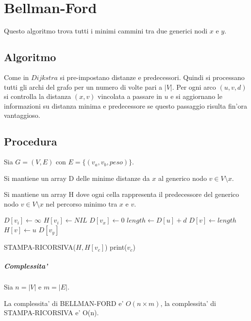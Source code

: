 \chapter{Bellman-Ford}

Questo algoritmo trova tutti i minimi cammini tra due generici nodi $x$ e $y$.

\section{Algoritmo}

Come in $Dijkstra$ si pre-impostano distanze e predecessori. Quindi si processano tutti gli archi del grafo per un numero di volte pari a $|V|$.
Per ogni arco $(u, v, d)$ si controlla la distanza $(x, v)$ vincolata a passare in $u$ e si aggiornano le informazioni su distanza minima e predecessore se questo passaggio risulta fin'ora vantaggioso.

\newpage

\section{Procedura}

Sia $G = (V, E)$ con $E = \{ (v_a, v_b, peso) \}$.

Si mantiene un array D delle minime distanze da $x$ al generico nodo $v \in V \setminus x$.

Si mantiene un array H dove ogni cella rappresenta il predecessore del generico nodo $v \in V \setminus x$ nel percorso minimo tra $x$ e $v$.

\begin{algorithm}
    \begin{algorithmic}
                \State $D[v_i] \gets \infty$
                \State $H[v_i] \gets NIL$
            \EndFor
            \State $D[v_x] \gets 0$
                    \State $length \gets D[u] + d$
                        \State $D[v] \gets length$
                        \State $H[v] \gets u$
                    \EndIf
                \EndFor
            \EndFor
            \State \Return $D[v_y]$
        \EndProcedure
    \end{algorithmic}
\end{algorithm}

\begin{algorithm}
    \begin{algorithmic}
                STAMPA-RICORSIVA($H, H[v_c]$)
            \EndIf
            print($v_c$)
        \EndProcedure
    \end{algorithmic}
\end{algorithm}

\paragraph{Complessita'}

Sia $n = |V|$ e $m = |E|$.

La complessita' di BELLMAN-FORD e' $O(n \times m)$, la complessita' di STAMPA-RICORSIVA e' O(n).
